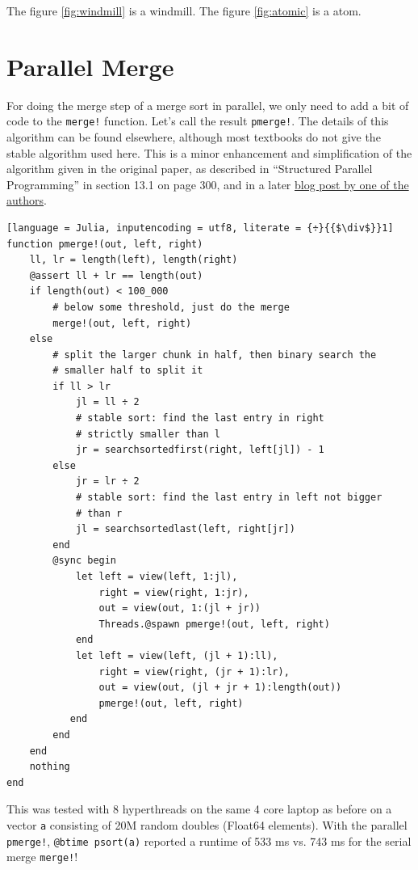 \documentclass{juliacon}
\begin{document}
The figure \ref{fig:windmill} is a windmill.
The figure \ref{fig:atomic} is a atom.



\appendix
\section{Parallel Merge}
\label{subsub:pmerge}

For doing the merge step of a merge sort in parallel, we only need to add a bit of code to the \verb|merge!| function. Let's call the result \verb|pmerge!|. The details of this algorithm can be found elsewhere, although most textbooks do not give the stable algorithm used here. This is a minor enhancement and simplification of the algorithm given in the original paper\cite{Gavril:1975:MPP:361020.361216}, as described in ``Structured Parallel Programming''\cite{McCool:2012:SPP:2385466} in section 13.1 on page 300, and in a later \href{https://software.intel.com/en-us/articles/a-parallel-stable-sort-using-c11-for-tbb-cilk-plus-and-openmp}{blog post by one of the authors}\cite{parallel-merge-intel}.

\begin{lstlisting}[language = Julia, inputencoding = utf8, literate = {÷}{{$\div$}}1]
function pmerge!(out, left, right)
    ll, lr = length(left), length(right)
    @assert ll + lr == length(out)
    if length(out) < 100_000
        # below some threshold, just do the merge
        merge!(out, left, right)
    else
        # split the larger chunk in half, then binary search the
        # smaller half to split it
        if ll > lr
            jl = ll ÷ 2
            # stable sort: find the last entry in right
            # strictly smaller than l
            jr = searchsortedfirst(right, left[jl]) - 1
        else
            jr = lr ÷ 2
            # stable sort: find the last entry in left not bigger
            # than r
            jl = searchsortedlast(left, right[jr])
        end
        @sync begin
            let left = view(left, 1:jl),
                right = view(right, 1:jr),
                out = view(out, 1:(jl + jr))
                Threads.@spawn pmerge!(out, left, right)
            end
            let left = view(left, (jl + 1):ll),
                right = view(right, (jr + 1):lr),
                out = view(out, (jl + jr + 1):length(out))
                pmerge!(out, left, right)
           end
        end
    end
    nothing
end
\end{lstlisting}

This was tested with 8 hyperthreads on the same 4 core laptop as before on a vector \verb|a| consisting of 20M random doubles (Float64 elements). With the parallel \verb|pmerge!|, \verb|@btime psort(a)| reported a runtime of 533 ms vs. 743 ms for the serial merge \verb|merge!|!
\end{document}
